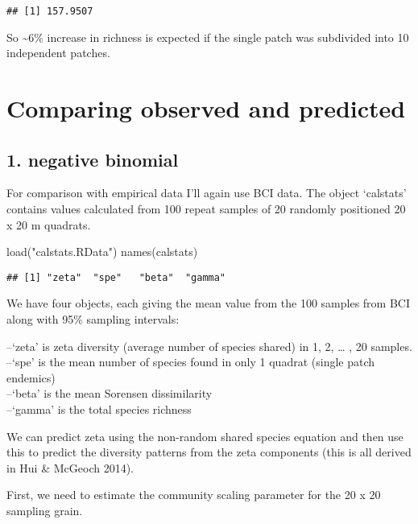 \documentclass[
]{article}
\newenvironment{Shaded}{\begin{snugshade}}{\end{snugshade}}
\newcommand{\FunctionTok}[1]{\textcolor[rgb]{0.00,0.00,0.00}{#1}}
\newcommand{\NormalTok}[1]{#1}
\newcommand{\StringTok}[1]{\textcolor[rgb]{0.31,0.60,0.02}{#1}}
\begin{document}
\begin{verbatim}
## [1] 157.9507
\end{verbatim}

So \textasciitilde6\% increase in richness is expected if the single
patch was subdivided into 10 independent patches.

\hypertarget{comparing-observed-and-predicted}{%
\section{Comparing observed and
predicted}\label{comparing-observed-and-predicted}}

\hypertarget{negative-binomial}{%
\subsection{1. negative binomial}\label{negative-binomial}}

For comparison with empirical data I'll again use BCI data. The object
`calstats' contains values calculated from 100 repeat samples of 20
randomly positioned 20 x 20 m quadrats.

\begin{Shaded}
\begin{Highlighting}[]
\FunctionTok{load}\NormalTok{(}\StringTok{"calstats.RData"}\NormalTok{)}
\FunctionTok{names}\NormalTok{(calstats)}
\end{Highlighting}
\end{Shaded}

\begin{verbatim}
## [1] "zeta"  "spe"   "beta"  "gamma"
\end{verbatim}

We have four objects, each giving the mean value from the 100 samples
from BCI along with 95\% sampling intervals:

--`zeta' is zeta diversity (average number of species shared) in 1, 2,
\ldots{} , 20 samples.\\
--`spe' is the mean number of species found in only 1 quadrat (single
patch endemics)\\
--`beta' is the mean Sorensen dissimilarity\\
--`gamma' is the total species richness

We can predict zeta using the non-random shared species equation and
then use this to predict the diversity patterns from the zeta components
(this is all derived in Hui \& McGeoch 2014).

First, we need to estimate the community scaling parameter for the 20 x
20 sampling grain.
\end{document}
